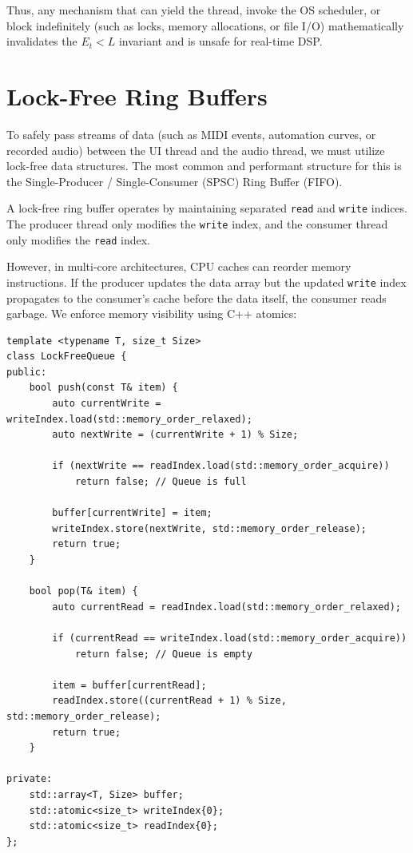\documentclass[11pt,a4paper]{article}
\begin{document}
Thus, any mechanism that can yield the thread, invoke the OS scheduler, or block indefinitely (such as locks, memory allocations, or file I/O) mathematically invalidates the $E_t < L$ invariant and is unsafe for real-time DSP.

\section{Lock-Free Ring Buffers}
To safely pass streams of data (such as MIDI events, automation curves, or recorded audio) between the UI thread and the audio thread, we must utilize lock-free data structures. The most common and performant structure for this is the Single-Producer / Single-Consumer (SPSC) Ring Buffer (FIFO).

A lock-free ring buffer operates by maintaining separated \texttt{read} and \texttt{write} indices. The producer thread only modifies the \texttt{write} index, and the consumer thread only modifies the \texttt{read} index. 

However, in multi-core architectures, CPU caches can reorder memory instructions. If the producer updates the data array but the updated \texttt{write} index propagates to the consumer's cache before the data itself, the consumer reads garbage. We enforce memory visibility using C++ atomics:

\begin{verbatim}
template <typename T, size_t Size>
class LockFreeQueue {
public:
    bool push(const T& item) {
        auto currentWrite = writeIndex.load(std::memory_order_relaxed);
        auto nextWrite = (currentWrite + 1) % Size;
        
        if (nextWrite == readIndex.load(std::memory_order_acquire))
            return false; // Queue is full

        buffer[currentWrite] = item;
        writeIndex.store(nextWrite, std::memory_order_release);
        return true;
    }

    bool pop(T& item) {
        auto currentRead = readIndex.load(std::memory_order_relaxed);
        
        if (currentRead == writeIndex.load(std::memory_order_acquire))
            return false; // Queue is empty

        item = buffer[currentRead];
        readIndex.store((currentRead + 1) % Size, std::memory_order_release);
        return true;
    }

private:
    std::array<T, Size> buffer;
    std::atomic<size_t> writeIndex{0};
    std::atomic<size_t> readIndex{0};
};
\end{verbatim}
\end{document}
